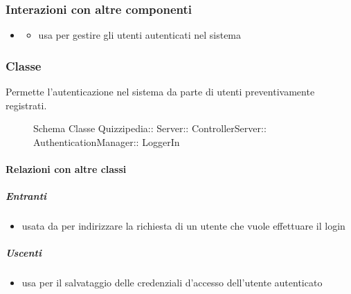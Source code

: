 \subsubsection{Interazioni con altre componenti}
\begin{itemize}
\item {}
\begin{itemize}
\item usa  per gestire gli utenti autenticati nel sistema
\end{itemize}
\end{itemize}
\subsubsection{Classe }
Permette l'autenticazione nel sistema da parte di utenti preventivamente registrati.
\begin{figure}[H]
\centering
\noindent{}
\caption[Schema Classe LoggerIn]{Schema Classe Quizzipedia:: Server:: ControllerServer:: AuthenticationManager:: LoggerIn}
\end{figure}
\paragraph{Relazioni con altre classi}
\subparagraph{Entranti}
\begin{itemize}
\item usata da  per indirizzare la richiesta di un utente che vuole effettuare il login
\end{itemize}
\subparagraph{Uscenti}
\begin{itemize}
\item usa  per il salvataggio delle credenziali d'accesso dell'utente autenticato
\end{itemize}
